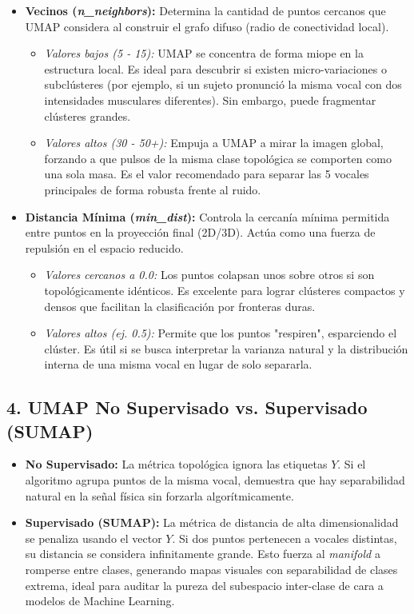 \documentclass[12pt, a4paper]{article}
\begin{document}
\begin{itemize}
    \item \textbf{Vecinos (\textit{n\_neighbors}):} Determina la cantidad de puntos cercanos que UMAP considera al construir el grafo difuso (radio de conectividad local).
    \begin{itemize}
        \item \textit{Valores bajos (5 - 15):} UMAP se concentra de forma miope en la estructura local. Es ideal para descubrir si existen micro-variaciones o subclústeres (por ejemplo, si un sujeto pronunció la misma vocal con dos intensidades musculares diferentes). Sin embargo, puede fragmentar clústeres grandes.
        \item \textit{Valores altos (30 - 50+):} Empuja a UMAP a mirar la imagen global, forzando a que pulsos de la misma clase topológica se comporten como una sola masa. Es el valor recomendado para separar las 5 vocales principales de forma robusta frente al ruido.
    \end{itemize}
    \item \textbf{Distancia Mínima (\textit{min\_dist}):} Controla la cercanía mínima permitida entre puntos en la proyección final (2D/3D). Actúa como una fuerza de repulsión en el espacio reducido.
    \begin{itemize}
        \item \textit{Valores cercanos a 0.0:} Los puntos colapsan unos sobre otros si son topológicamente idénticos. Es excelente para lograr clústeres compactos y densos que facilitan la clasificación por fronteras duras.
        \item \textit{Valores altos (ej. 0.5):} Permite que los puntos "respiren", esparciendo el clúster. Es útil si se busca interpretar la varianza natural y la distribución interna de una misma vocal en lugar de solo separarla.
    \end{itemize}
\end{itemize}

\subsection{4. UMAP No Supervisado vs. Supervisado (SUMAP)}
\begin{itemize}
    \item \textbf{No Supervisado:} La métrica topológica ignora las etiquetas $Y$. Si el algoritmo agrupa puntos de la misma vocal, demuestra que hay separabilidad natural en la señal física sin forzarla algorítmicamente.
    \item \textbf{Supervisado (SUMAP):} La métrica de distancia de alta dimensionalidad se penaliza usando el vector $Y$. Si dos puntos pertenecen a vocales distintas, su distancia se considera infinitamente grande. Esto fuerza al \textit{manifold} a romperse entre clases, generando mapas visuales con separabilidad de clases extrema, ideal para auditar la pureza del subespacio inter-clase de cara a modelos de Machine Learning.
\end{itemize}
\end{document}
